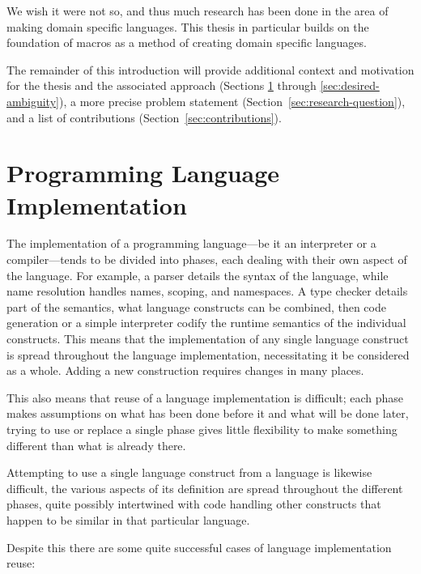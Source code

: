 \documentclass{kththesis}
\begin{document}
We wish it were not so, and thus much research has been done in the area of making domain specific languages. This thesis in particular builds on the foundation of macros as a method of creating domain specific languages.

The remainder of this introduction will provide additional context and motivation for the thesis and the associated approach (Sections \ref{sec:compiler-design} through \ref{sec:desired-ambiguity}), a more precise problem statement (Section~\ref{sec:research-question}), and a list of contributions (Section~\ref{sec:contributions}).

\section{Programming Language Implementation} \label{sec:compiler-design}

The implementation of a programming language---be it an interpreter or a compiler---tends to be divided into phases, each dealing with their own aspect of the language. For example, a parser details the syntax of the language, while name resolution handles names, scoping, and namespaces. A type checker details part of the semantics, what language constructs can be combined, then code generation or a simple interpreter codify the runtime semantics of the individual constructs. This means that the implementation of any single language construct is spread throughout the language implementation, necessitating it be considered as a whole. Adding a new construction requires changes in many places.

This also means that reuse of a language implementation is difficult; each phase makes assumptions on what has been done before it and what will be done later, trying to use or replace a single phase gives little flexibility to make something different than what is already there.

Attempting to use a single language construct from a language is likewise difficult, the various aspects of its definition are spread throughout the different phases, quite possibly intertwined with code handling other constructs that happen to be similar in that particular language.

Despite this there are some quite successful cases of language implementation reuse:
\end{document}
